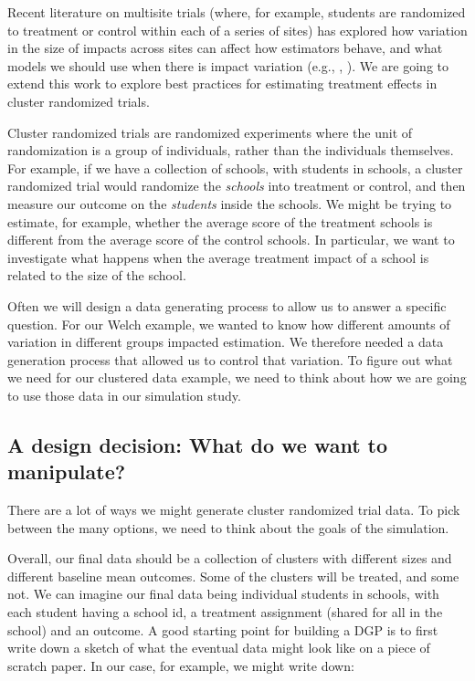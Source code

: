\documentclass[
]{book}
\begin{document}
Recent literature on multisite trials (where, for example, students are randomized to treatment or control within each of a series of sites) has explored how variation in the size of impacts across sites can affect how estimators behave, and what models we should use when there is impact variation (e.g., \citet{miratrix2021applied}, \citet{Bloom:2016um}).
We are going to extend this work to explore best practices for estimating treatment effects in cluster randomized trials.

Cluster randomized trials are randomized experiments where the unit of randomization is a group of individuals, rather than the individuals themselves.
For example, if we have a collection of schools, with students in schools, a cluster randomized trial would randomize the \emph{schools} into treatment or control, and then measure our outcome on the \emph{students} inside the schools.
We might be trying to estimate, for example, whether the average score of the treatment schools is different from the average score of the control schools.
In particular, we want to investigate what happens when the average treatment impact of a school is related to the size of the school.

Often we will design a data generating process to allow us to answer a specific question.
For our Welch example, we wanted to know how different amounts of variation in different groups impacted estimation.
We therefore needed a data generation process that allowed us to control that variation.
To figure out what we need for our clustered data example, we need to think about how we are going to use those data in our simulation study.

\subsection{A design decision: What do we want to manipulate?}\label{a-design-decision-what-do-we-want-to-manipulate}

There are a lot of ways we might generate cluster randomized trial data.
To pick between the many options, we need to think about the goals of the simulation.

Overall, our final data should be a collection of clusters with different sizes and different baseline mean outcomes.
Some of the clusters will be treated, and some not.
We can imagine our final data being individual students in schools, with each student having a school id, a treatment assignment (shared for all in the school) and an outcome.
A good starting point for building a DGP is to first write down a sketch of what the eventual data might look like on a piece of scratch paper.
In our case, for example, we might write down:
\end{document}
